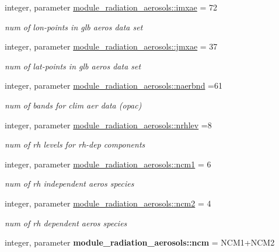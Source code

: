 \begin{DoxyCompactItemize}
integer, parameter \hyperlink{group__module__radiation__aerosols_ga52cda855a397136f75768d205292ddbb}{module\+\_\+radiation\+\_\+aerosols\+::imxae} = 72
\begin{DoxyCompactList}\small\item\em num of lon-\/points in glb aeros data set \end{DoxyCompactList}\item 
integer, parameter \hyperlink{group__module__radiation__aerosols_gafdfdd058364062349b02cec9c712ea80}{module\+\_\+radiation\+\_\+aerosols\+::jmxae} = 37
\begin{DoxyCompactList}\small\item\em num of lat-\/points in glb aeros data set \end{DoxyCompactList}\item 
integer, parameter \hyperlink{group__module__radiation__aerosols_gae8ffb66e7e617f045663ce2732743b4a}{module\+\_\+radiation\+\_\+aerosols\+::naerbnd} =61
\begin{DoxyCompactList}\small\item\em num of bands for clim aer data (opac) \end{DoxyCompactList}\item 
integer, parameter \hyperlink{group__module__radiation__aerosols_gaa6d18b0588e80cb40871cc75870d09ba}{module\+\_\+radiation\+\_\+aerosols\+::nrhlev} =8
\begin{DoxyCompactList}\small\item\em num of rh levels for rh-\/dep components \end{DoxyCompactList}\item 
integer, parameter \hyperlink{group__module__radiation__aerosols_gac6bc533a79d4b19129834cbc9a9fbc18}{module\+\_\+radiation\+\_\+aerosols\+::ncm1} = 6
\begin{DoxyCompactList}\small\item\em num of rh independent aeros species \end{DoxyCompactList}\item 
integer, parameter \hyperlink{group__module__radiation__aerosols_ga61dbcce5b0bb02dd31d4a37983887a7b}{module\+\_\+radiation\+\_\+aerosols\+::ncm2} = 4
\begin{DoxyCompactList}\small\item\em num of rh dependent aeros species \end{DoxyCompactList}\item 
integer, parameter {\bfseries module\+\_\+radiation\+\_\+aerosols\+::ncm} = N\+C\+M1+N\+C\+M2
\item 

\end{DoxyCompactItemize}
